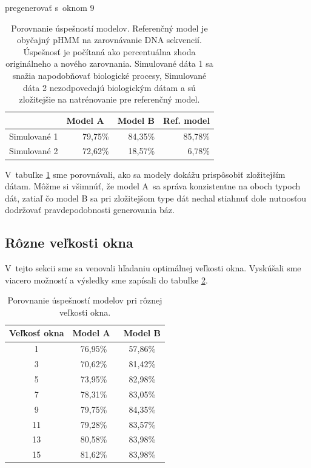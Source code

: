 \begin{table}[htp]
\todo pregenerovať s~oknom 9\\
\centering
\begin{tabular}{crrr}
\toprule
& Model A~& Model B & Ref. model\\
\midrule
Simulované 1 & 79,75\% & 84,35\% & 85,78\%\\
Simulované 2 & 72,62\% & 18,57\% & 6,78\% \\
\bottomrule
\end{tabular}

\caption[Porovnanie úspešností modelov]{Porovnanie úspešností modelov. Referenčný model je obyčajný pHMM na zarovnávanie DNA sekvencií. Úspešnosť je počítaná ako percentuálna zhoda originálneho a nového zarovnania. Simulované dáta 1 sa snažia napodobňovať biologické procesy, Simulované dáta 2 nezodpovedajú biologickým dátam a sú zložitejšie na natrénovanie pre referenčný model.}
\label{tab:success-compare}
\end{table}

V~tabuľke \ref{tab:success-compare} sme porovnávali, ako sa modely dokážu prispôsobiť zložitejším dátam. Môžme si všimnúť, že model A~sa správa konzistentne na oboch typoch dát, zatiaľ čo model B sa pri zložitejšom type dát nechal stiahnuť dole nutnosťou dodržovať pravdepodobnosti generovania báz.

\subsection{Rôzne veľkosti okna}

V~tejto sekcii sme sa venovali hľadaniu optimálnej veľkosti okna. Vyskúšali sme viacero možností a výsledky sme zapísali do tabuľke \ref{tab:window-compare}.

\begin{table}[htp]
\centering
\begin{tabular}{ccc}
\toprule
Veľkosť okna & Model A~& Model B\\
\midrule
1 & 76,95\% & 57,86\%\\
3 & 70,62\% & 81,42\%\\
5 & 73,95\% & 82,98\%\\
7 & 78,31\% & 83,05\%\\
9 & 79,75\% & 84,35\%\\
11 & 79,28\% & 83,57\%\\
13 & 80,58\% & 83,98\%\\
15 & 81,62\% & 83,98\%\\
\bottomrule
\end{tabular}
\caption[Porovnanie úspešností pri rôznej veľkosti okna]{Porovnanie úspešností modelov pri rôznej veľkosti okna.}
\label{tab:window-compare}
\end{table}

